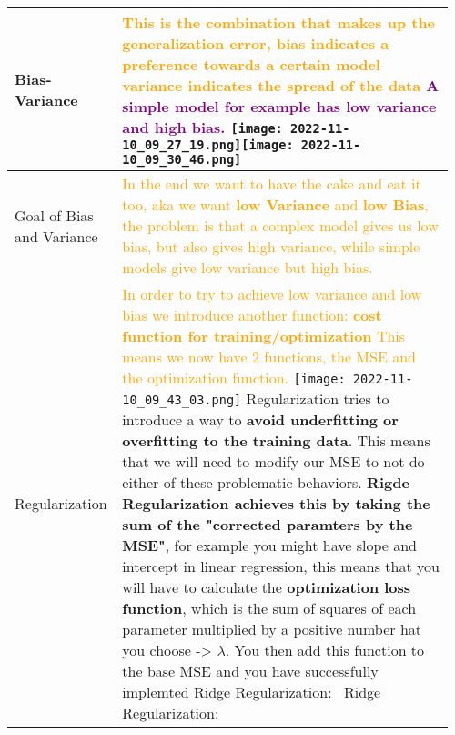 \documentclass[main.tex,fontsize=8pt,paper=a4,paper=portrait,DIV=calc,]{scrartcl}
\begin{document}
\begin{table}[ht!]
\begin{tabular}{|m{0.2\linewidth}|m{0.755\linewidth}|}
\hline
Bias-Variance & 
\textcolor{orange}{This is the combination that makes up the generalization error, \newline
\textbf{bias indicates a preference towards a certain model}\newline
\textbf{variance indicates the spread of the data}}\newline
\textcolor{purple}{\textbf{A simple model for example has low variance and high bias.}}\newline
\texttt{[image: 2022-11-10\_09\_27\_19.png]}\texttt{[image: 2022-11-10\_09\_30\_46.png]}\\
\hline
Goal of Bias and Variance & 
\textcolor{orange}{In the end we want to have the cake and eat it too, aka we want \textbf{low Variance} and \textbf{low Bias}, \newline
the problem is that a complex model gives us low bias, but also gives high variance, while simple models give low variance but high bias.}\\
\hline
Regularization & 
\textcolor{orange}{In order to try to achieve low variance and low bias we introduce another function: \textbf{cost function for training/optimization}\newline
This means we now have 2 functions, the MSE and the optimization function.}\newline
\texttt{[image: 2022-11-10\_09\_43\_03.png]}\newline
Regularization tries to introduce a way to \textbf{avoid underfitting or overfitting to the training data}. \newline
This means that we will need to modify our MSE to not do either of these problematic behaviors.\newline
\textbf{Rigde Regularization achieves this by taking the sum of the "corrected paramters by the MSE"}, for example you might have slope and intercept in linear regression, this means that you will have to calculate the \textbf{optimization loss function}, which is the sum of squares of each parameter multiplied by a positive number hat you choose -> \(\lambda\). \newline You then add this function to the base MSE and you have successfully implemted Ridge Regularization:\newline
\, \newline
\textcolor{OliveGreen}{Ridge Regularization:}\newline

\end{tabular}
\end{table}
\end{document}
